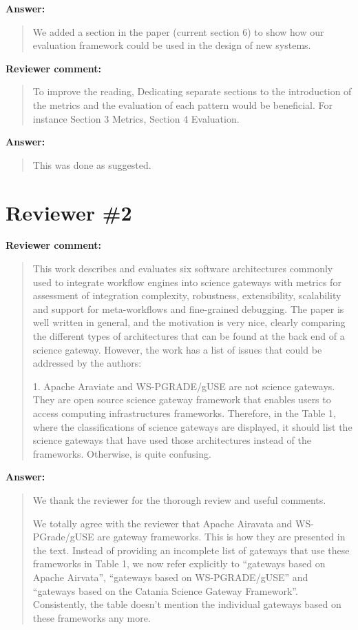 \documentclass[a4]{article}
\newenvironment{review}%
{\textbf{Reviewer comment:}\begin{quote}}%
{\end{quote}}%
\newenvironment{answer}%
{\textbf{Answer:}\begin{small}\begin{quote}}%
{\end{quote}\end{small}}%
\begin{document}
\begin{answer}
  We added a section in the paper (current section 6) to show how our
  evaluation framework could be used in the design of new systems.
\end{answer}

\begin{review}
  To improve the reading, Dedicating separate sections to the
  introduction of the metrics and the evaluation of each pattern would
  be beneficial. For instance Section 3 Metrics, Section 4 Evaluation.
\end{review}

\begin{answer}
  This was done as suggested.
\end{answer}

\section{Reviewer \#2}

\begin{review}
  This work describes and evaluates six software architectures
  commonly used to integrate workflow engines into science gateways
  with metrics for assessment of integration complexity, robustness,
  extensibility, scalability and support for meta-workflows and
  fine-grained debugging. The paper is well written in general, and
  the motivation is very nice, clearly comparing the different types
  of architectures that can be found at the back end of a science
  gateway. However, the work has a list of issues that could be
  addressed by the authors:

1. Apache Araviate and WS-PGRADE/gUSE are not science gateways. They
are open source science gateway framework that enables users to access
computing infrastructures frameworks. Therefore, in the Table 1, where
the classifications of science gateways are displayed, it should list
the science gateways that have used those architectures instead of the
frameworks. Otherwise, is quite confusing.
\end{review}

\begin{answer}
We thank the reviewer for the thorough review and useful comments.

We totally agree with the reviewer that Apache Airavata and
WS-PGrade/gUSE are gateway frameworks. This is how they are presented
in the text. Instead of providing an incomplete list of gateways that
use these frameworks in Table 1, we now refer explicitly to ``gateways
based on Apache Airvata'', ``gateways based on WS-PGRADE/gUSE'' and
``gateways based on the Catania Science Gateway
Framework''. Consistently, the table doesn't mention the individual
gateways based on these frameworks any more.
\end{answer}
\end{document}
